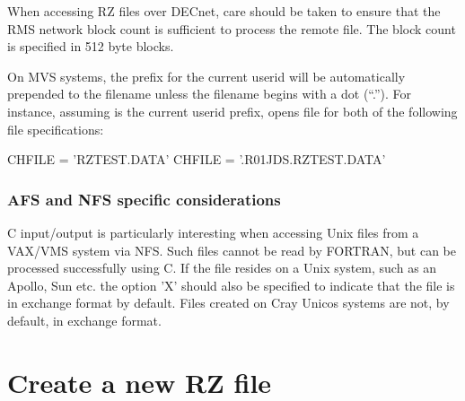 When accessing RZ files over DECnet, care should be taken
to ensure that the RMS network block count is sufficient
to process the remote file. The block count is specified
in 512 byte blocks.


On MVS systems, the prefix for the current userid
will be automatically prepended to the filename
unless the filename begins with a dot (``.'').
For instance, assuming  is the current userid prefix,
 opens file  for both of the following 
file specifications:
\begin{XMP}
      CHFILE = 'RZTEST.DATA'
      CHFILE = '.R01JDS.RZTEST.DATA'
\end{XMP}

\subsubsection*{AFS and NFS specific considerations}

C input/output is particularly interesting when accessing Unix
files from a VAX/VMS system via NFS. Such files cannot
be read by FORTRAN, but can be processed successfully
using C. If the file resides on a Unix system, such
as an Apollo, Sun etc. the option 'X' should also be
specified to indicate that the file is in exchange format
by default. Files created on Cray Unicos systems are not,
by default, in exchange format.

\section{Create a new RZ file}

